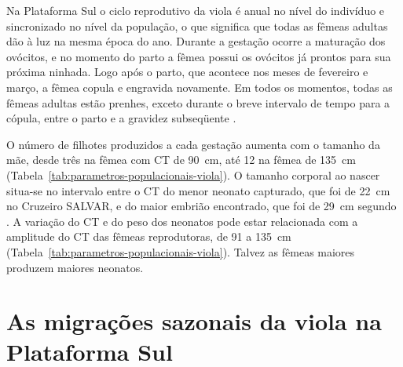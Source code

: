 \documentclass[a4paper,11pt,twoside,showtrims,onecolumn,openright,final]{memoir}
\begin{document}

Na Plataforma Sul o ciclo reprodutivo da viola é anual no nível do indivíduo e 
sincronizado no nível da população, o que significa que todas as fêmeas adultas 
dão à luz na mesma época do ano. Durante a gestação ocorre a maturação 
dos ovócitos, e no momento do parto a fêmea possui os ovócitos já prontos para 
sua próxima ninhada.    Logo após o parto, que acontece nos meses de fevereiro 
e março, a fêmea copula e engravida novamente. Em todos os momentos, todas 
as fêmeas adultas estão prenhes, exceto durante o breve intervalo de tempo 
para a cópula, entre o parto e a gravidez subseqüente \citep{lessa1986}. %

O número de filhotes produzidos a cada gestação aumenta com o tamanho da mãe, 
desde três na fêmea com CT de 90~cm, até 12 na fêmea de 135~cm (Tabela~\ref{tab:parametros-populacionais-viola}). 
O tamanho corporal ao nascer situa-se no intervalo entre o CT do menor 
neonato capturado, que foi de 22~cm no Cruzeiro SALVAR, e do maior embrião 
encontrado, que foi de 29~cm segundo \citet{lessa1982}. A variação do CT e do 
peso dos neonatos pode estar relacionada com a amplitude do CT das fêmeas 
reprodutoras, de 91 a 135~cm (Tabela~\ref{tab:parametros-populacionais-viola}).
Talvez as fêmeas maiores produzem maiores neonatos.

\section*{As migrações sazonais da viola na Plataforma Sul}
\end{document}
